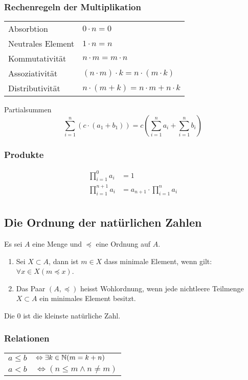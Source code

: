 \subsubsection{Rechenregeln der Multiplikation}
\settowidth{\MyLenA}{Neutrales Element~~}
\begin{tabular}{@{}p{\the\MyLenA}%
				@{}p{}}
	Absorbtion				& $0 \cdot n = 0$\\
	Neutrales Element 		& $1 \cdot n = n$\\
	Kommutativität			& $n \cdot m = m \cdot n$\\
	Assoziativität			& $(n \cdot m) \cdot k = n \cdot (m \cdot k)$\\
	Distributivität			& $n \cdot (m + k) = n \cdot m + n \cdot k$\\
\end{tabular}
Partialsummen
\begin{equation*}
	\sum_{i=1}^n (c \cdot(a_1 + b_1)) = c \left (\sum_{i=1}^n a_i + \sum_{i=1}^n b_i \right )
\end{equation*}

\subsubsection{Produkte}
\begin{align*}
	\prod_{i=1}^0 a_i& = 1\\
	\prod_{i=1}^{n + 1} a_i& = a_{n+1} \cdot \prod_{i=1}^n a_i\\
\end{align*}

\subsection{Die Ordnung der natürlichen Zahlen}
Es sei $A$ eine Menge und $\preceq$ eine Ordnung auf $A$.
\begin{enumerate}
	\item Sei $X \subset A$, dann ist $m \in X$ dass minimale Element, wenn gilt: $\forall x \in X (m \preceq x)$.
	\item Das Paar $(A, \preceq)$ heisst Wohlordnung, wenn jede nichtleere Teilmenge $X \subset A$ ein minimales Element besitzt.
\end{enumerate}
Die 0 ist die kleinste natürliche Zahl.

\subsubsection{Relationen}
\settowidth{\MyLenA}{$a \leq b$ ~~}
\begin{tabular}{@{}p{\the\MyLenA}%
				@{}p{}}
	$a \leq b$				& $\Leftrightarrow \exists k \in \mathbb{N} (m = k + n)$\\
	$a < b$ 				& $\Leftrightarrow (n \leq m \wedge n \neq m)$\\
\end{tabular}


